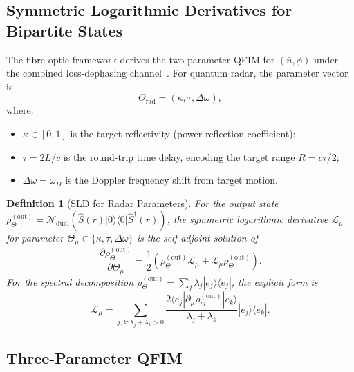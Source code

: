 \documentclass[journal]{IEEEtran}
\newtheorem{definition}{Definition}
\begin{document}
\subsection{Symmetric Logarithmic Derivatives for Bipartite States}

The fibre-optic framework derives the two-parameter QFIM for $(\bar{n}, \phi)$ under the combined loss-dephasing channel~\cite{gautum2024rigorous}. For quantum radar, the parameter vector is
\begin{equation}\label{eq:radar_params}
\Theta_{\text{rad}} = (\kappa, \tau, \Delta\omega),
\end{equation}
where:
\begin{itemize}
    \item $\kappa \in [0,1]$ is the target reflectivity (power reflection coefficient);
    \item $\tau = 2L/c$ is the round-trip time delay, encoding the target range $R = c\tau/2$;
    \item $\Delta\omega = \omega_D$ is the Doppler frequency shift from target motion.
\end{itemize}

\begin{definition}[SLD for Radar Parameters]\label{def:sld_radar}
For the output state $\rho_{\Theta}^{(\text{out})} = \mathcal{N}_{\text{dual}}(\hat{S}(r)|0\rangle\langle 0|\hat{S}^\dagger(r))$, the symmetric logarithmic derivative $\mathcal{L}_\mu$ for parameter $\Theta_\mu \in \{\kappa, \tau, \Delta\omega\}$ is the self-adjoint solution of
\begin{equation}\label{eq:sld_radar}
\frac{\partial\rho_{\Theta}^{(\text{out})}}{\partial\Theta_\mu} = \frac{1}{2}\left(\rho_{\Theta}^{(\text{out})}\mathcal{L}_\mu + \mathcal{L}_\mu\rho_{\Theta}^{(\text{out})}\right).
\end{equation}
For the spectral decomposition $\rho_{\Theta}^{(\text{out})} = \sum_j \lambda_j |e_j\rangle\langle e_j|$, the explicit form is
\begin{equation}\label{eq:sld_explicit}
\mathcal{L}_\mu = \sum_{j,k: \lambda_j + \lambda_k > 0} \frac{2\langle e_j|\partial_\mu\rho_{\Theta}^{(\text{out})}|e_k\rangle}{\lambda_j + \lambda_k} |e_j\rangle\langle e_k|.
\end{equation}
\end{definition}

\subsection{Three-Parameter QFIM}
\end{document}
